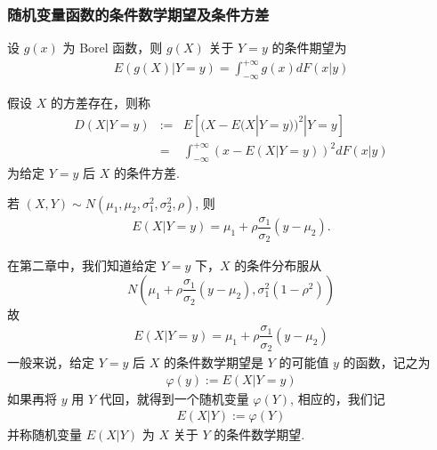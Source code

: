 \begin{frame}
	\frametitle{随机变量函数的条件数学期望及条件方差}
	\begin{thm}
		设 $g (x)$ 为 Borel 函数，则 $g (X)$ 关于 $Y=y$ 的条件期望为
		\begin{eqnarray*}
			E(g(X)|Y=y)=\int_{-\infty}^{+\infty}g(x)dF(x|y)
		\end{eqnarray*}
	\end{thm}
	\pause
	\begin{defi}
		假设 $X$ 的方差存在，则称
		\begin{eqnarray*}
			D(X|Y=y)&:=&E[(X-E(X|Y=y))^2|Y=y]\\
			&=&\int_{-\infty}^{+\infty}(x-E(X|Y=y))^2dF(x|y)
		\end{eqnarray*}
		为给定 $Y=y$ 后 $X$ 的条件方差.
	\end{defi}


\end{frame}
\begin{frame}
	\vspace{0.3cm}
	\begin{exam}
		若 $(X,Y)\sim N (\mu_1,\mu_2,\sigma_1^2,\sigma_2^2,\rho)$, 则
		\begin{eqnarray*}
			E(X|Y=y)=\mu_1+\rho \dfrac{\sigma_1}{\sigma_2}(y-\mu_2).
		\end{eqnarray*}
	\end{exam}%
	\zheng 在第二章中，我们知道给定 $Y=y$ 下，$X$ 的条件分布服从
	\[N(\mu_1+\rho \dfrac{\sigma_1}{\sigma_2}(y-\mu_2), \sigma_1^2(1-\rho^2))\]
	\pause 故
	\begin{eqnarray*}
		E(X|Y=y)=\mu_1+\rho \dfrac{\sigma_1}{\sigma_2}(y-\mu_2)
	\end{eqnarray*}
	\pause 一般来说，给定 $Y=y$ 后 $X$ 的条件数学期望是 $Y$ 的可能值 $y$ 的函数，记之为
	\begin{eqnarray*}
		\varphi(y):=E(X|Y=y)
	\end{eqnarray*}
	\pause  如果再将 $y$ 用 $Y$ 代回，就得到一个随机变量 $\varphi (Y)$, 相应的，我们记
	\begin{eqnarray*}
		E(X|Y):=\varphi(Y)
	\end{eqnarray*}
	并称随机变量 $E (X|Y)$ 为 $X$ 关于 $Y$ 的条件数学期望.
\end{frame}
